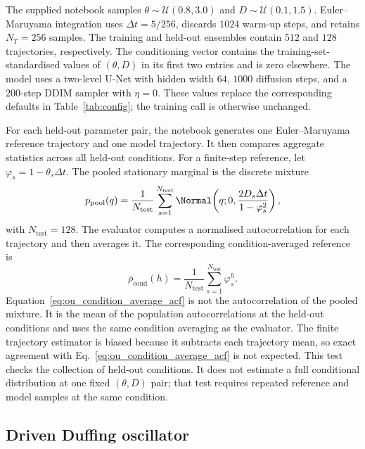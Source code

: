 The supplied notebook samples $\theta\sim\mathcal{U}(0.8,3.0)$ and
$D\sim\mathcal{U}(0.1,1.5)$. Euler--Maruyama integration uses
$\Delta t=5/256$, discards $1024$ warm-up steps, and retains $N_T=256$ samples.
The training and held-out ensembles contain $512$ and $128$ trajectories,
respectively. The conditioning vector contains the training-set-standardised
values of $(\theta,D)$ in its first two entries and is zero elsewhere. The model
uses a two-level U-Net with hidden width $64$, $1000$ diffusion steps, and a
$200$-step DDIM sampler with $\eta=0$. These values replace the corresponding
defaults in Table~\ref{tab:config}; the training call is otherwise unchanged.

For each held-out parameter pair, the notebook generates one Euler--Maruyama
reference trajectory and one model trajectory. It then compares aggregate
statistics across all held-out conditions. For a finite-step reference, let
$\varphi_s=1-\theta_s\Delta t$. The pooled stationary marginal is the discrete
mixture
\begin{equation}
    p_{\mathrm{pool}}(q)
    =
    \frac{1}{N_{\mathrm{test}}}
    \sum_{s=1}^{N_{\mathrm{test}}}
    \Normal\!\left(q;0,\frac{2D_s\Delta t}{1-\varphi_s^2}\right),
    \label{eq:ou_pooled_mixture}
\end{equation}
with $N_{\mathrm{test}}=128$. The evaluator computes a normalised
autocorrelation for each trajectory and then averages it. The corresponding
condition-averaged reference is
\begin{equation}
    \overline{\rho}_{\mathrm{cond}}(h)
    =
    \frac{1}{N_{\mathrm{test}}}
    \sum_{s=1}^{N_{\mathrm{test}}}\varphi_s^h.
    \label{eq:ou_condition_average_acf}
\end{equation}
Equation~\eqref{eq:ou_condition_average_acf} is not the autocorrelation of the
pooled mixture. It is the mean of the population autocorrelations at the held-out
conditions and uses the same condition averaging as the evaluator. The finite
trajectory estimator is biased because it subtracts each trajectory mean, so exact
agreement with Eq.~\eqref{eq:ou_condition_average_acf} is not expected. This test
checks the collection of held-out conditions. It does not estimate a full
conditional distribution at one fixed $(\theta,D)$ pair; that test requires
repeated reference and model samples at the same condition.

\subsection{Driven Duffing oscillator}
\label{ssec:duffing}

